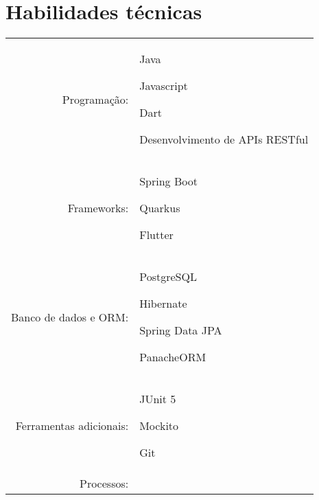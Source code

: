 \documentclass[a4paper,12pt]{article}
\begin{document}

\section{Habilidades técnicas}
\begin{tabular}{rp{15.2cm}}
\raggedleft Programação:
& \begin{itemize*}[label=\Large\textbullet] %
    \item Java
    \item Javascript
    \item Dart
    \item Desenvolvimento de APIs RESTful
\end{itemize*}\\
\raggedleft Frameworks:
& \begin{itemize*}[label=\Large\textbullet]
    \item Spring Boot
    \item Quarkus
    \item Flutter
\end{itemize*}\\
\raggedleft Banco de dados e ORM:
& \begin{itemize*}[label=\Large\textbullet]
    \item PostgreSQL
    \item Hibernate
    \item Spring Data JPA
    \item PanacheORM
\end{itemize*}\\
\raggedleft Ferramentas adicionais:
& \begin{itemize*}[label=\Large\textbullet]
    \item JUnit 5
    \item Mockito
    \item Git
\end{itemize*}\\
\raggedleft Processos:

\end{tabular}
\end{document}
